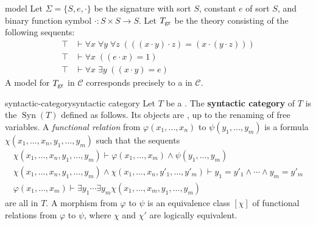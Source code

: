 \begin{example}{model}
    Let $\Sigma = \{ S, e, \cdot \}$ be the signature with sort $S$, constant $e$ of sort $S$, and binary function symbol $\cdot \colon S \times S \to S$. Let $T_\textup{gr}$ be the theory consisting of the following sequents:
    \[ \begin{aligned}
        \top &\vdash \forall x \; \forall y \; \forall z \; (((x \cdot y) \cdot z) = (x \cdot (y \cdot z))) \\
        \top &\vdash \forall x \; ((e \cdot x) = 1) \\
        \top &\vdash \forall x \; \exists y \; ((x \cdot y) = e)
    \end{aligned} \]
    A model for $T_\textup{gr}$ in $\mathcal{C}$ corresponds precisely to a  in $\mathcal{C}$.
\end{example}


\begin{topic}{syntactic-category}{syntactic category}
    Let $T$ be a . The \textbf{syntactic category} of $T$ is the  $\operatorname{Syn}(T)$ defined as follows. Its objects are , up to the renaming of free variables.
    A \textit{functional relation} from $\varphi(x_1, \ldots, x_n)$ to $\psi(y_1, \ldots, y_m)$ is a formula $\chi(x_1, \ldots, x_n, y_1, 
    \ldots, y_m)$ such that the sequents
    \[ \begin{aligned}
        \chi(x_1, \ldots, x_n, y_1, \ldots, y_m) \vdash \varphi(x_1, \ldots, x_m) \land \psi(y_1, \ldots, y_m) \\
        \chi(x_1, \ldots, x_n, y_1, \ldots, y_m) \land \chi(x_1, \ldots, x_n, y'_1, \ldots, y'_m) \vdash y_1 = y'_1 \land \cdots \land y_m = y'_m \\
        \varphi(x_1, \ldots, x_m) \vdash \exists y_1 \cdots \exists y_m \chi(x_1, \ldots, x_m, y_1, \ldots, y_m)
    \end{aligned} \]
    are all in $T$. A morphism from $\varphi$ to $\psi$ is an equivalence class $[\chi]$ of functional relations from $\varphi$ to $\psi$, where $\chi$ and $\chi'$ are logically equivalent.
\end{topic}

